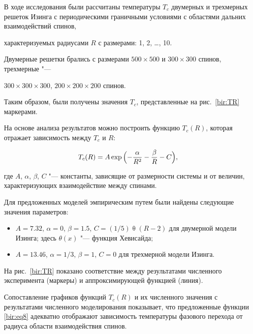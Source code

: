В ходе исследования были рассчитаны температуры $T_c$ двумерных и трехмерных решеток Изинга с периодическими граничными условиями с областями дальних взаимодействий спинов,

характеризуемых радиусами $R$ с размерами: 1, 2, \dots, 10.    

Двумерные  решетки брались с размерами $500 \times 500$ и $300 \times 300$ спинов, трехмерные "---

 $300 \times 300 \times 300$, $200 \times 200 \times 200$ спинов.  

 Таким образом, были получены значения $T_c$, представленные на рис.~\ref{bir:TR} маркерами.





На основе анализа результатов можно построить функцию $T_{c}(R)$, которая отражает зависимость между $T_c$ и $R$:

\begin{equation}

T_{c}(R) = A \exp{\Bigl(-\frac{\alpha}{R^2} - \frac{\beta}{R}- C\Bigr)},

\label{bir:eq8}

\end{equation}

где $A$, $\alpha$, $\beta$, $C$ "--- константы, зависящие от размерности системы и от величин, характеризующих взаимодействие между спинами.



Для предложенных моделей эмпирическим путем  были найдены следующие значения параметров:



\begin{itemize}

\item[] $A = 7.32$, $\alpha = 0$, $\beta=1.5$, $C=(1/5)\mathop{\theta}(R-2)$ для двумерной модели Изинга; здесь $\theta(x)$ "--- функция Хевисайда;

\item[] $A = 13.46$, $\alpha = 1/3$, $\beta=1$, $C=0$ для трехмерной модели Изинга.



\end{itemize}





На рис.~\ref{bir:TR} показано соответствие между результатами численного эксперимента (маркеры) и аппроксимирующей функцией (линия). 

Сопоставление графиков функций $T_{c}(R)$ и их численного значения с результатами численного моделирования показывает, что предложенные функции \eqref{bir:eq8} адекватно отображают зависимость температуры фазового перехода от радиуса области взаимодействия спинов.



